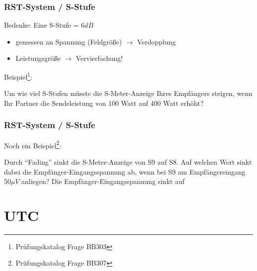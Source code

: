 \begin{frame}
  \frametitle{RST-System / S-Stufe}

  Bedenke: Eine S-Stufe = $6 dB$

  \begin{itemize}
    \item gemessen an Spannung (Feldgröße) $\rightarrow$ Verdopplung
    \item Leistungsgröße $\rightarrow$ Vervierfachung!
  \end{itemize}

  \vspace{1cm}

  Beispiel\footnote{Prüfungskatalog Frage BB303}:

  \begin{exampleblock}{Um wie viel S-Stufen müsste die S-Meter-Anzeige Ihres
    Empfängers steigen, wenn Ihr Partner die Sendeleistung von 100
    Watt auf 400 Watt erhöht?}
  \end{exampleblock}

\end{frame}

\begin{frame}
  \frametitle{RST-System / S-Stufe}

  Noch ein Beispiel\footnote{Prüfungskatalog Frage BB307}:

  \begin{exampleblock}{Durch ``Fading'' sinkt die S-Meter-Anzeige von S9 auf S8. Auf
    welchen Wert sinkt dabei die Empfänger-Eingangsspannung ab,
    wenn bei S9 am Empfängereingang $50\mu V$ anliegen? Die
    Empfänger-Eingangsspannung sinkt auf}
  \end{exampleblock}

\end{frame}

\section{UTC}

